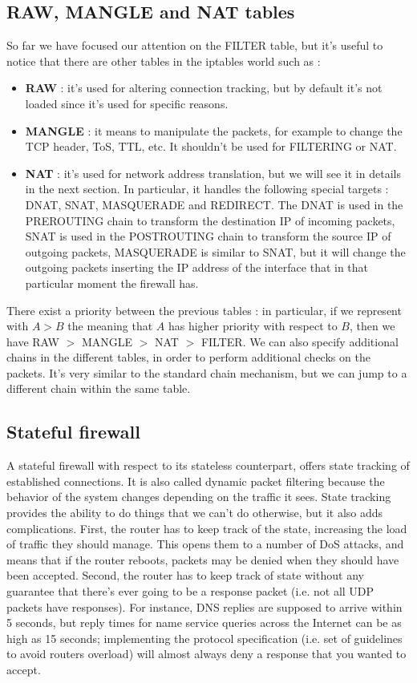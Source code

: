 \documentclass[11pt]{article}
\begin{document}
\subsection{RAW, MANGLE and NAT tables}
So far we have focused our attention on the FILTER table, but it's useful to notice that there are other tables in the iptables world such as :
\begin{itemize}
\item \textbf{RAW} : it's used for altering connection tracking, but by default it's not loaded since it's used for specific reasons.
\item \textbf{MANGLE} : it means to manipulate the packets, for example to change the TCP header, ToS, TTL, etc. It shouldn't be used for FILTERING or NAT.
\item \textbf{NAT} : it's used for network address translation, but we will see it in details in the next section. In particular, it handles the following special targets : DNAT, SNAT, MASQUERADE and REDIRECT. The DNAT is used in the PREROUTING chain to transform the destination IP of incoming packets, SNAT is used in the POSTROUTING chain to transform the source IP of outgoing packets, MASQUERADE is similar to SNAT, but it will change the outgoing packets inserting the IP address of the interface that in that particular moment the firewall has.
\end{itemize}
There exist a priority between the previous tables : in particular, if we represent with $A > B$ the meaning that $A$ has higher priority with respect to $B$, then we have RAW $>$ MANGLE $>$ NAT $>$ FILTER. We can also specify additional chains in the different tables, in order to perform additional checks on the packets. It's very similar to the standard chain mechanism, but we can jump to a different chain within the same table.
\subsection{Stateful firewall}
A stateful firewall with respect to its stateless counterpart, offers state tracking of established connections. It is also called dynamic packet filtering because the behavior of the system changes depending on the traffic it sees. State tracking provides the ability to do things that we can't do otherwise, but it also adds complications. First, the router has to keep track of the state, increasing the load of traffic they should manage. This opens them to a number of DoS attacks, and means that if the router reboots, packets may be denied when they should have been accepted. Second, the router has to keep track of state without any guarantee that there's ever going to be a response packet (i.e. not all UDP packets have responses). For instance, DNS replies are supposed to arrive within 5 seconds, but reply times for name service queries across the Internet can be as high as 15 seconds; implementing the protocol specification (i.e. set of guidelines to avoid routers overload) will almost always deny a response that you wanted to accept.
\end{document}
